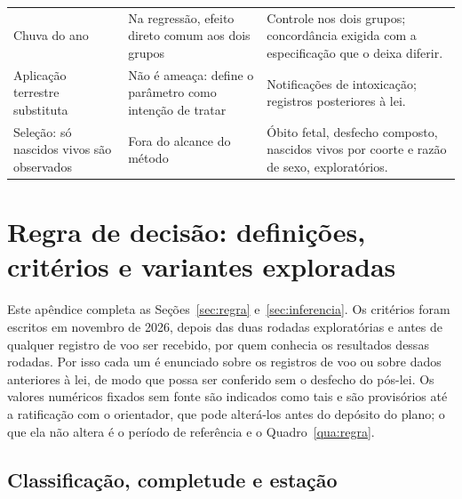 \begin{apendicesenv}
\begin{quadro}[htb]
\begin{tabular}{@{}p{4.4cm}p{4.6cm}p{5.5cm}@{}}
Chuva do ano &
Na regressão, efeito direto comum aos dois grupos &
Controle nos dois grupos; concordância exigida com a especificação que o deixa diferir. \\
Aplicação terrestre substituta &
Não é ameaça: define o parâmetro como intenção de tratar &
Notificações de intoxicação; registros posteriores à lei. \\
Seleção: só nascidos vivos são observados &
Fora do alcance do método &
Óbito fetal, desfecho composto, nascidos vivos por coorte e razão de sexo, exploratórios. \\
\bottomrule
\end{tabular}
\end{quadro}

\clearpage
\chapter{Regra de decisão: definições, critérios e variantes exploradas}
\label{ap:regra}

Este apêndice completa as Seções~\ref{sec:regra} e~\ref{sec:inferencia}. Os
critérios foram escritos em novembro de 2026, depois das duas rodadas
exploratórias e antes de qualquer registro de voo ser recebido, por quem
conhecia os resultados dessas rodadas. Por isso cada um é enunciado sobre os
registros de voo ou sobre dados anteriores à lei, de modo que possa ser
conferido sem o desfecho do pós-lei. Os valores numéricos fixados sem fonte
são indicados como tais e são provisórios até a ratificação com o orientador,
que pode alterá-los antes do depósito do plano; o que ela não altera é o
período de referência e o Quadro~\ref{qua:regra}.

\section{Classificação, completude e estação}


\end{apendicesenv}
